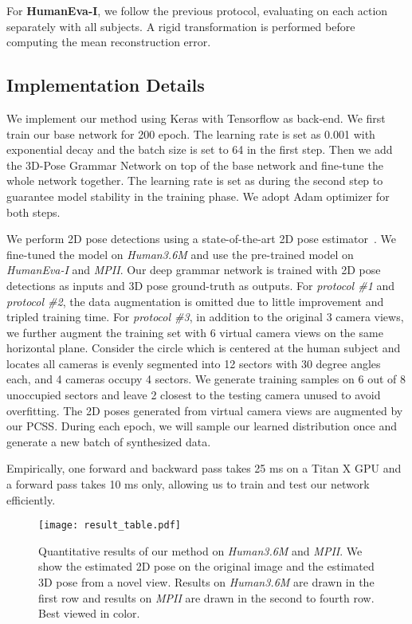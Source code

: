 \documentclass[letterpaper]{article} \usepackage{aaai18}  \usepackage{times}  \usepackage{helvet}  \usepackage{courier}  \usepackage{url}  \usepackage{color}
\begin{document}
For \textbf{HumanEva-I}, we follow the previous protocol, evaluating on each action separately with all subjects. A rigid transformation is performed before computing the mean reconstruction error.

\subsection{Implementation Details}

We implement our method using Keras with Tensorflow as back-end. We first train our base network for 200 epoch. The learning rate is set as 0.001 with exponential decay and the batch size is set to 64 in the first step. Then we add the 3D-Pose Grammar Network on top of the base network and fine-tune the whole network together. The learning rate is set as  during the second step to guarantee model stability in the training phase. We adopt Adam optimizer for both steps.

We perform 2D pose detections using a state-of-the-art 2D pose estimator~\cite{newell2016stacked}. We fine-tuned the model on \textit{Human3.6M} and use the pre-trained model on \textit{HumanEva-I} and \textit{MPII}. Our deep grammar network is trained with 2D pose detections as inputs and 3D pose ground-truth as outputs. For \textit{protocol \#1} and \textit{protocol \#2}, the data augmentation is omitted due to little improvement and tripled training time. For \textit{protocol \#3}, in addition to the original 3 camera views, we further augment the training set with 6 virtual camera views on the same horizontal plane. Consider the circle which is centered at the human subject and locates all cameras is evenly segmented into 12 sectors with 30 degree angles each, and 4 cameras occupy 4 sectors. We generate training samples on 6 out of 8 unoccupied sectors and leave 2 closest to the testing camera unused to avoid overfitting. The 2D poses generated from virtual camera views are augmented by our PCSS. During each epoch, we will sample our learned distribution once and generate a new batch of synthesized data.

Empirically, one forward and backward pass takes 25 ms on a Titan X GPU and a forward pass takes 10 ms only, allowing us to train and test our network efficiently.
\begin{figure*}[htb]
 \begin{center}
 \texttt{[image: result\_table.pdf]}
 \caption{Quantitative results of our method on \textit{Human3.6M} and \textit{MPII}. We show the estimated 2D pose on the original image and the estimated 3D pose from a novel view. Results on \textit{Human3.6M} are drawn in the first row and results on \textit{MPII} are drawn in the second to fourth row. Best viewed in color.}
 \label{fig:result_table}
 \end{center}
\end{figure*}
\end{document}

